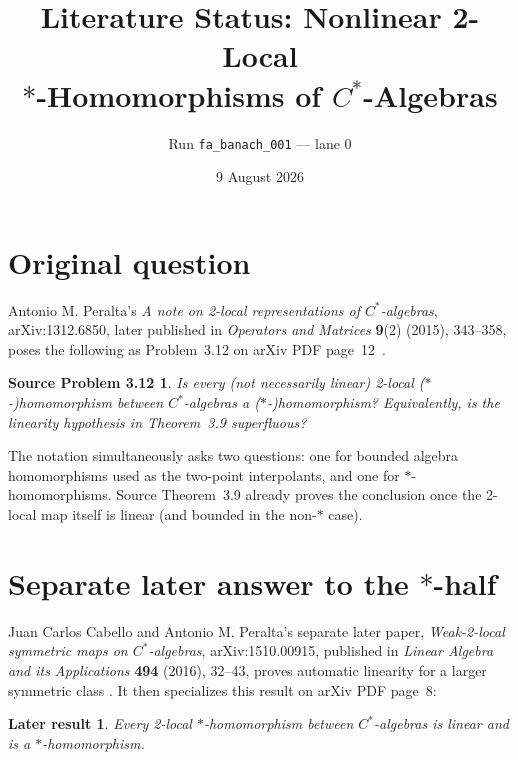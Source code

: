\documentclass[11pt]{article}
\title{Literature Status: Nonlinear 2-Local\\
$*$-Homomorphisms of $C^*$-Algebras}
\author{Run \texttt{fa\_banach\_001} --- lane 0}
\date{9 August 2026}
\newtheorem*{question}{Source Problem 3.12}
\newtheorem*{answer}{Later result}
\begin{document}
\maketitle

\begin{center}
\end{center}

\section{Original question}

Antonio M. Peralta's \emph{A note on 2-local representations of
$C^*$-algebras}, arXiv:1312.6850, later published in
\emph{Operators and Matrices} \textbf{9}(2) (2015), 343--358,
poses the following as Problem~3.12 on arXiv PDF page~12~\cite{source}.

\begin{question}
Is every (not necessarily linear) 2-local ($*$-)homomorphism between
$C^*$-algebras a ($*$-)homomorphism? Equivalently, is the linearity
hypothesis in Theorem~3.9 superfluous?
\end{question}

The notation simultaneously asks two questions: one for bounded algebra
homomorphisms used as the two-point interpolants, and one for
$*$-homomorphisms.  Source Theorem~3.9 already proves the conclusion once
the 2-local map itself is linear (and bounded in the non-$*$ case).

\section{Separate later answer to the \texorpdfstring{$*$}{star}-half}

Juan Carlos Cabello and Antonio M. Peralta's separate later paper,
\emph{Weak-2-local symmetric maps on $C^*$-algebras}, arXiv:1510.00915,
published in \emph{Linear Algebra and its Applications} \textbf{494}
(2016), 32--43, proves automatic linearity for a larger symmetric class
\cite{answerpaper}.  It then specializes this result on arXiv PDF page~8:

\begin{answer}
\leavevmode\par\noindent
Every 2-local $*$-homomorphism between $C^*$-algebras is linear and is a
$*$-homomorphism.
\end{answer}
\end{document}
